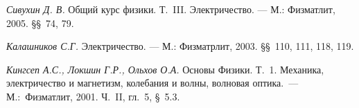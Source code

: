 \begin{lab:literature}
	
	\item \emph{Сивухин Д. В.} Общий курс физики. Т.~III. Электричество. --- М.: Физматлит, 2005. \S\S~74, 79.
	
	\item \emph{Калашников С.Г.} Электричество. --- М.: Физматрлит, 2003. \S\S~110, 111, 118, 119.
	
	\item \emph{Кингсеп А.С., Локшин Г.Р., Ольхов О.А.} Основы Физики. Т.~1. Механика, электричество и магнетизм, колебания и
	волны, волновая оптика.~--- М.:~Физматлит, 2001. Ч.~II, гл.~5, \S~5.3.
	
\end{lab:literature}
